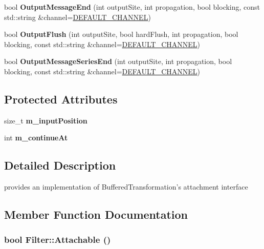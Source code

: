 \begin{DoxyCompactItemize}
\item 
\hypertarget{class_filter_a39f3b7cf5ef1e3f2348f6901bf5dc563}{
bool {\bfseries OutputMessageEnd} (int outputSite, int propagation, bool blocking, const std::string \&channel=\hyperlink{cryptlib_8h_a6f1917f54ea8c2a45de6e08c5087c8de}{DEFAULT\_\-CHANNEL})}
\label{class_filter_a39f3b7cf5ef1e3f2348f6901bf5dc563}

\item 
\hypertarget{class_filter_aaeca75213acea1eefa3f1b716f404994}{
bool {\bfseries OutputFlush} (int outputSite, bool hardFlush, int propagation, bool blocking, const std::string \&channel=\hyperlink{cryptlib_8h_a6f1917f54ea8c2a45de6e08c5087c8de}{DEFAULT\_\-CHANNEL})}
\label{class_filter_aaeca75213acea1eefa3f1b716f404994}

\item 
\hypertarget{class_filter_afe0a55175966d99209dbf0e2c64ca556}{
bool {\bfseries OutputMessageSeriesEnd} (int outputSite, int propagation, bool blocking, const std::string \&channel=\hyperlink{cryptlib_8h_a6f1917f54ea8c2a45de6e08c5087c8de}{DEFAULT\_\-CHANNEL})}
\label{class_filter_afe0a55175966d99209dbf0e2c64ca556}

\end{DoxyCompactItemize}
\subsection*{Protected Attributes}
\begin{DoxyCompactItemize}
\item 
\hypertarget{class_filter_a5efea4f6caff4dca805c831a911eb1db}{
size\_\-t {\bfseries m\_\-inputPosition}}
\label{class_filter_a5efea4f6caff4dca805c831a911eb1db}

\item 
\hypertarget{class_filter_ab57fb6112bb2cb7c018941bdcd7b4570}{
int {\bfseries m\_\-continueAt}}
\label{class_filter_ab57fb6112bb2cb7c018941bdcd7b4570}

\end{DoxyCompactItemize}


\subsection{Detailed Description}
provides an implementation of BufferedTransformation's attachment interface 

\subsection{Member Function Documentation}
\hypertarget{class_filter_a6e7251247b5c2cc3b0c15e861cc88e16}{
\subsubsection[{Attachable}]{\setlength{\rightskip}{0pt plus 5cm}bool Filter::Attachable ()}}
\label{class_filter_a6e7251247b5c2cc3b0c15e861cc88e16}


